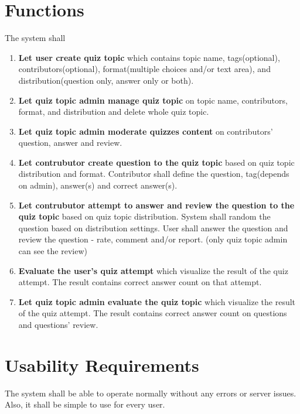 \documentclass[ 10pt]{report}
\begin{document}
        \section{Functions}
        The system shall
        \begin{enumerate}
            \item \textbf{Let user create quiz topic} which contains topic name, tags(optional), contributors(optional), format(multiple choices and/or text area), and distribution(question only, answer only or both).
            \item \textbf{Let quiz topic admin manage quiz topic} on topic name, contributors, format, and distribution and delete whole quiz topic.
            \item \textbf{Let quiz topic admin moderate quizzes content} on contributors' question, answer and review.
            \item \textbf{Let contrubutor create question to the quiz topic} based on quiz topic distribution and format. Contributor shall define the question, tag(depends on admin), answer(s) and correct answer(s).
            \item \textbf{Let contrubutor attempt to answer and review the question to the quiz topic} based on quiz topic distribution. System shall random the question based on distribution settings. User shall answer the question and review the question - rate, comment and/or report. (only quiz topic admin can see the review)
            \item \textbf{Evaluate the user's quiz attempt} which visualize the result of the quiz attempt. The result contains correct answer count on that attempt.
            \item \textbf{Let quiz topic admin evaluate the quiz topic} which visualize the result of the quiz attempt. The result contains correct answer count on questions and questions' review.
        \end{enumerate}
        \section{Usability Requirements}
        The system shall be able to operate normally without any errors or server issues. Also, it shall be simple to use for every user.
\end{document}
